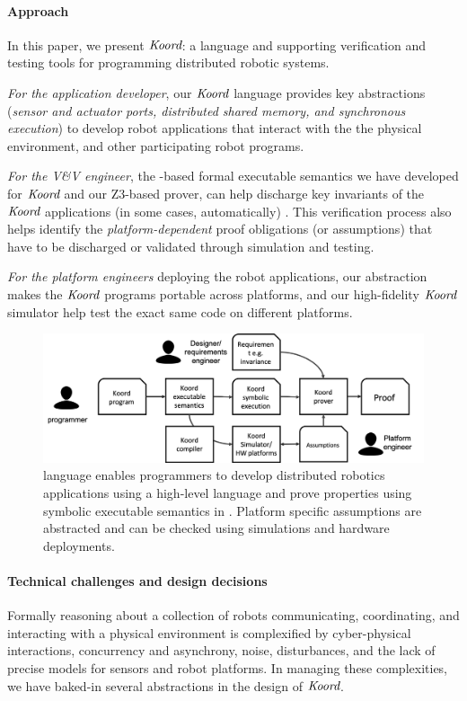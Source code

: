 \paragraph{Approach} In this paper, we present $\emph{Koord}$: a language and supporting verification and testing tools for programming distributed robotic systems. 
\begin{noinditem}
\item {\em For the application developer}, our $\emph{Koord}$ language provides key abstractions (\emph{sensor and actuator ports, distributed shared memory, and synchronous execution}) to develop robot applications that interact with the the physical environment, and other participating robot programs.
\item {\em For the V\&V engineer}, the \K-based formal executable semantics we have developed for $\emph{Koord}$ and our Z3-based prover, can help discharge key invariants of the $\emph{Koord}$ applications (in some cases, automatically) . This verification process also helps identify the {\em platform-dependent\/} proof obligations (or assumptions) that have to be discharged or validated through simulation and testing.
\item {\em For the platform engineers\/} deploying the robot applications, our abstraction makes the $\emph{Koord}$ programs portable across platforms, and our high-fidelity $\emph{Koord}$ simulator help test the exact same code on different platforms.
\end{noinditem}

\begin{figure}[h!]
\includegraphics[width=\linewidth]{figs/koorduser.png}
\caption{\small \lgname language  enables programmers to develop distributed robotics applications using a high-level language and prove properties using symbolic executable semantics in \K. Platform specific assumptions are abstracted and can be checked using simulations and hardware deployments.}
\label{fig:koorduser}
\end{figure}

\paragraph{Technical challenges and design decisions}
Formally reasoning about a collection of robots communicating, coordinating, and interacting with a physical environment is complexified by  cyber-physical interactions, concurrency and asynchrony, noise, disturbances, and the lack of precise models for sensors and robot platforms. In managing these complexities, we have baked-in several abstractions in the design of $\emph{Koord}$.
%

